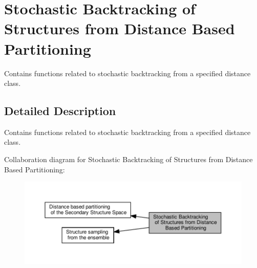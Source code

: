 \hypertarget{group__kl__neighborhood__stochbt}{}\section{Stochastic Backtracking of Structures from Distance Based Partitioning}
\label{group__kl__neighborhood__stochbt}


Contains functions related to stochastic backtracking from a specified distance class.  




\subsection{Detailed Description}
Contains functions related to stochastic backtracking from a specified distance class. 

Collaboration diagram for Stochastic Backtracking of Structures from Distance Based Partitioning\+:
\nopagebreak
\begin{figure}[H]
\begin{center}
\leavevmode
\includegraphics[width=350pt]{group__kl__neighborhood__stochbt}
\end{center}
\end{figure}
